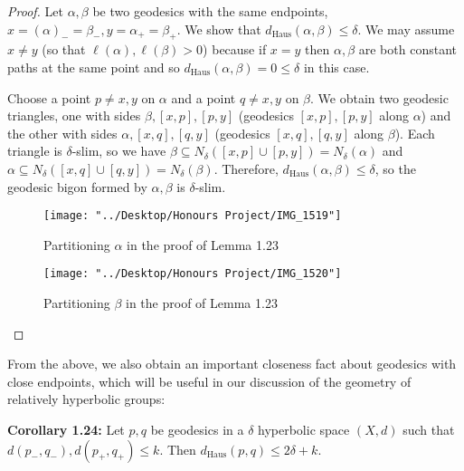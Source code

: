 \documentclass[12pt]{article}
\newcommand{\vs}{\vskip10pt}
\begin{document}
	\begin{proof}
		
		Let $\alpha, \beta$ be two geodesics with the same endpoints, $x = (\alpha)_- = \beta_-, y = \alpha_+ = \beta_+$. We show that $d_{\text{Haus}}(\alpha, \beta) \leq \delta$. We may assume $x \neq y$ (so that $\ell(\alpha), \ell(\beta) > 0$) because if $x = y$ then $\alpha, \beta$ are both constant paths at the same point and so $d_{\text{Haus}}(\alpha, \beta) = 0 \leq \delta$ in this case. 
		
		\vs 
		
		Choose a point $p \neq x,y$ on $\alpha$ and a point $q \neq x,y$ on $\beta$. We  obtain two geodesic triangles, one with sides $\beta, [x,p], [p,y]$ (geodesics $[x,p], [p,y]$ along $\alpha$) and the other with sides $\alpha, [x, q], [q, y]$ (geodesics $ [x, q], [q, y]$ along $\beta$). Each triangle is $\delta$-slim, so we have $\beta \subseteq N_{\delta}([x,p] \cup [p, y]) = N_{\delta}(\alpha)$ and $\alpha \subseteq N_{\delta}([x,q] \cup [q, y]) = N_{\delta}(\beta)$. Therefore, $d_{\text{Haus}}(\alpha, \beta) \leq \delta$, so the geodesic bigon formed by $\alpha, \beta$ is $\delta$-slim. 
		
\begin{figure} [H]
	\centering
	\texttt{[image: "../Desktop/Honours Project/IMG\_1519"]}
	\caption{Partitioning $\alpha$ in the proof of Lemma 1.23}
	\label{fig:img1519}
\end{figure}

\begin{figure} [H]
	\centering
	\texttt{[image: "../Desktop/Honours Project/IMG\_1520"]}
	\caption{Partitioning $\beta$ in the proof of Lemma 1.23}
	\label{fig:img1520}
\end{figure}

		
	\end{proof}
	
	
	From the above, we also obtain an important closeness fact about geodesics with close endpoints, which will be useful in our discussion of the geometry of relatively hyperbolic groups: 
	
	\vs 
	
	\textbf{Corollary 1.24: } Let $p,q$ be geodesics in a $\delta$ hyperbolic space $(X,d)$ such that $d(p_-, q_-), d(p_+, q_+) \leq k$. Then $d_{\text{Haus}}(p,q) \leq 2 \delta + k$. 
	
\end{document}
